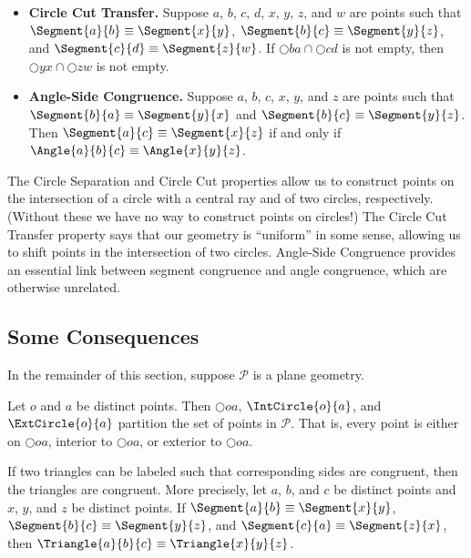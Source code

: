 \documentclass{article}
\begin{document}
\begin{dfn}
\begin{itemize}
\item \textbf{Circle Cut Transfer.} Suppose $a$, $b$, $c$, $d$, $x$, $y$, $z$, and $w$ are points such that $\Segment{a}{b} \equiv \Segment{x}{y}$, $\Segment{b}{c} \equiv \Segment{y}{z}$, and $\Segment{c}{d} \equiv \Segment{z}{w}$. If $\Circle{b}{a} \cap \Circle{c}{d}$ is not empty, then $\Circle{y}{x} \cap \Circle{z}{w}$ is not empty.

\item \textbf{Angle-Side Congruence.} Suppose $a$, $b$, $c$, $x$, $y$, and $z$ are points such that $\Segment{b}{a} \equiv \Segment{y}{x}$ and $\Segment{b}{c} \equiv \Segment{y}{z}$. Then $\Segment{a}{c} \equiv \Segment{x}{z}$ if and only if $\Angle{a}{b}{c} \equiv \Angle{x}{y}{z}$.
\end{itemize}
\end{dfn}

The Circle Separation and Circle Cut properties allow us to construct points on the intersection of a circle with a central ray and of two circles, respectively. (Without these we have no way to construct points on circles!) The Circle Cut Transfer property says that our geometry is ``uniform'' in some sense, allowing us to shift points in the intersection of two circles. Angle-Side Congruence provides an essential link between segment congruence and angle congruence, which are otherwise unrelated.

\subsection*{Some Consequences}

In the remainder of this section, suppose $\mathcal{P}$ is a plane geometry.

\begin{prop}
Let $o$ and $a$ be distinct points. Then $\Circle{o}{a}$, $\IntCircle{o}{a}$, and $\ExtCircle{o}{a}$ partition the set of points in $\mathcal{P}$. That is, every point is either on $\Circle{o}{a}$, interior to $\Circle{o}{a}$, or exterior to $\Circle{o}{a}$.
\end{prop}

\begin{prop}
If two triangles can be labeled such that corresponding sides are congruent, then the triangles are congruent. More precisely, let $a$, $b$, and $c$ be distinct points and $x$, $y$, and $z$ be distinct points. If $\Segment{a}{b} \equiv \Segment{x}{y}$, $\Segment{b}{c} \equiv \Segment{y}{z}$, and $\Segment{c}{a} \equiv \Segment{z}{x}$, then $\Triangle{a}{b}{c} \equiv \Triangle{x}{y}{z}$.
\end{prop}
\end{document}
